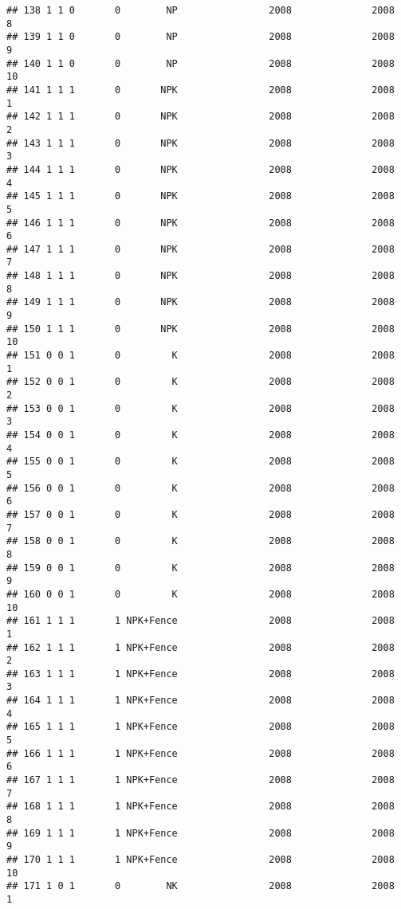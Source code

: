\documentclass[]{article}
\begin{document}
\begin{verbatim}
## 138 1 1 0       0        NP                2008              2008        8
## 139 1 1 0       0        NP                2008              2008        9
## 140 1 1 0       0        NP                2008              2008       10
## 141 1 1 1       0       NPK                2008              2008        1
## 142 1 1 1       0       NPK                2008              2008        2
## 143 1 1 1       0       NPK                2008              2008        3
## 144 1 1 1       0       NPK                2008              2008        4
## 145 1 1 1       0       NPK                2008              2008        5
## 146 1 1 1       0       NPK                2008              2008        6
## 147 1 1 1       0       NPK                2008              2008        7
## 148 1 1 1       0       NPK                2008              2008        8
## 149 1 1 1       0       NPK                2008              2008        9
## 150 1 1 1       0       NPK                2008              2008       10
## 151 0 0 1       0         K                2008              2008        1
## 152 0 0 1       0         K                2008              2008        2
## 153 0 0 1       0         K                2008              2008        3
## 154 0 0 1       0         K                2008              2008        4
## 155 0 0 1       0         K                2008              2008        5
## 156 0 0 1       0         K                2008              2008        6
## 157 0 0 1       0         K                2008              2008        7
## 158 0 0 1       0         K                2008              2008        8
## 159 0 0 1       0         K                2008              2008        9
## 160 0 0 1       0         K                2008              2008       10
## 161 1 1 1       1 NPK+Fence                2008              2008        1
## 162 1 1 1       1 NPK+Fence                2008              2008        2
## 163 1 1 1       1 NPK+Fence                2008              2008        3
## 164 1 1 1       1 NPK+Fence                2008              2008        4
## 165 1 1 1       1 NPK+Fence                2008              2008        5
## 166 1 1 1       1 NPK+Fence                2008              2008        6
## 167 1 1 1       1 NPK+Fence                2008              2008        7
## 168 1 1 1       1 NPK+Fence                2008              2008        8
## 169 1 1 1       1 NPK+Fence                2008              2008        9
## 170 1 1 1       1 NPK+Fence                2008              2008       10
## 171 1 0 1       0        NK                2008              2008        1

\end{verbatim}
\end{document}
